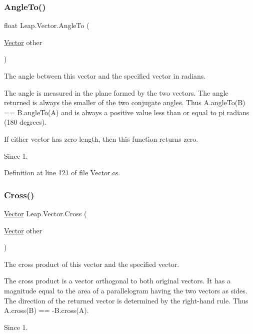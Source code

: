 \subsubsection{\texorpdfstring{AngleTo()}{AngleTo()}}
{\footnotesize\ttfamily float Leap.\+Vector.\+Angle\+To (\begin{DoxyParamCaption}\item[{\mbox{\hyperlink{struct_leap_1_1_vector}{Vector}}}]{other }\end{DoxyParamCaption})}



The angle between this vector and the specified vector in radians. 

The angle is measured in the plane formed by the two vectors. The angle returned is always the smaller of the two conjugate angles. Thus A.\+angle\+To(\+B) == B.\+angle\+To(\+A) and is always a positive value less than or equal to pi radians (180 degrees).

If either vector has zero length, then this function returns zero. \begin{DoxySince}{Since}
1. 
\end{DoxySince}


Definition at line 121 of file Vector.\+cs.

\mbox{\label{struct_leap_1_1_vector_acdd326aa3bd6ac8eaf4d0c321db129cb}} 
\subsubsection{\texorpdfstring{Cross()}{Cross()}}
{\footnotesize\ttfamily \mbox{\hyperlink{struct_leap_1_1_vector}{Vector}} Leap.\+Vector.\+Cross (\begin{DoxyParamCaption}\item[{\mbox{\hyperlink{struct_leap_1_1_vector}{Vector}}}]{other }\end{DoxyParamCaption})}



The cross product of this vector and the specified vector. 

The cross product is a vector orthogonal to both original vectors. It has a magnitude equal to the area of a parallelogram having the two vectors as sides. The direction of the returned vector is determined by the right-\/hand rule. Thus A.\+cross(\+B) == -\/\+B.\+cross(A).

\begin{DoxySince}{Since}
1. 
\end{DoxySince}


